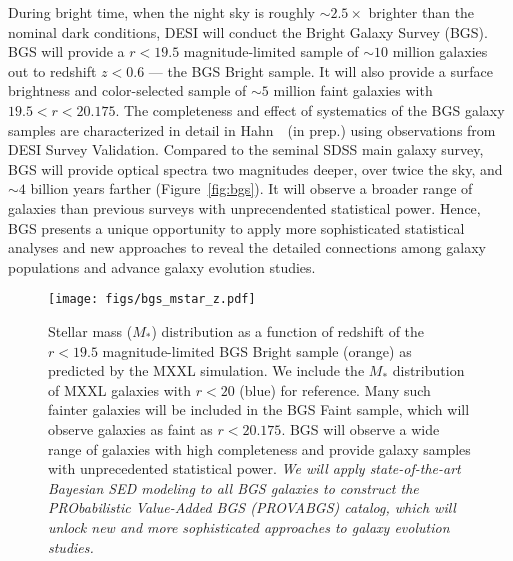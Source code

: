 During bright time, when the night sky is roughly ${\sim}2.5\times$ brighter
than the nominal dark conditions, DESI will conduct the Bright Galaxy Survey
(BGS). 
BGS will provide a $r < 19.5$ magnitude-limited sample of ${\sim}10$ million
galaxies out to redshift $z < 0.6$ --- the BGS Bright sample. 
It will also provide a surface brightness and color-selected sample of 
${\sim}5$ million faint galaxies with $19.5 < r < 20.175$. 
The completeness and effect of systematics of the BGS galaxy samples are
characterized in detail in Hahn~\etal~(in prep.) using observations from
DESI Survey Validation. 
Compared to the seminal SDSS main galaxy survey, BGS will provide optical
spectra two magnitudes deeper, over twice the sky, and ${\sim}4$ billion years
farther (Figure~\ref{fig:bgs}). 
It will observe a broader range of galaxies than previous surveys with
unprecendented statistical power. 
Hence, BGS presents a unique opportunity to apply more sophisticated statistical
analyses and new approaches to reveal the detailed connections among galaxy
populations and  advance galaxy evolution studies. 

\begin{figure}
\begin{center}
    \texttt{[image: figs/bgs\_mstar\_z.pdf]}
    \caption{
        Stellar mass ($M_*$) distribution as a function of redshift of the $r < 19.5$
        magnitude-limited BGS Bright sample (orange) as predicted by the MXXL
        simulation. 
        We include the $M_*$ distribution of MXXL galaxies with $r < 20$ (blue)
        for reference.
        Many such fainter galaxies will be included in the BGS Faint sample,
        which will observe galaxies as faint as $r < 20.175$. 
        BGS will observe a wide range of galaxies with high completeness and
        provide galaxy samples with unprecedented statistical power.
        \emph{We will apply state-of-the-art Bayesian SED modeling to all BGS
        galaxies to construct the PRObabilistic Value-Added BGS (PROVABGS)
        catalog, which will unlock new and more sophisticated approaches to
        galaxy evolution studies.}}\label{fig:bgs_mstar}
\end{center}
\end{figure}

